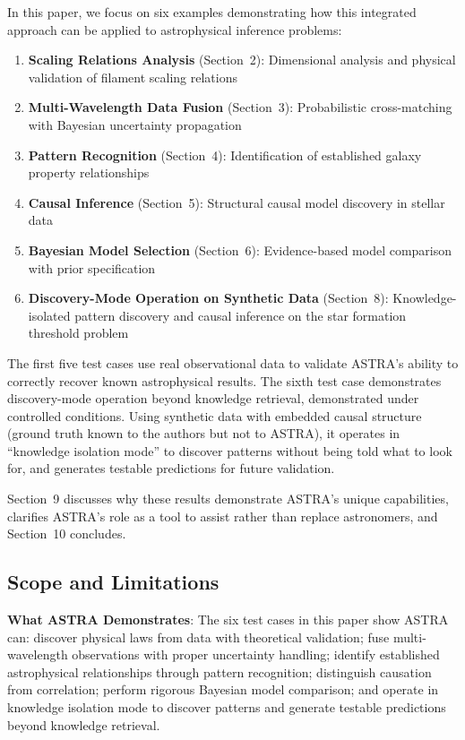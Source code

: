 \documentclass[usenatbib]{rasti}
\begin{document}
In this paper, we focus on six examples demonstrating how this integrated approach can be applied to astrophysical inference problems:
\begin{enumerate}
\item \textbf{Scaling Relations Analysis} (Section~2): Dimensional analysis and physical validation of filament scaling relations
\item \textbf{Multi-Wavelength Data Fusion} (Section~3): Probabilistic cross-matching with Bayesian uncertainty propagation
\item \textbf{Pattern Recognition} (Section~4): Identification of established galaxy property relationships
\item \textbf{Causal Inference} (Section~5): Structural causal model discovery in stellar data
\item \textbf{Bayesian Model Selection} (Section~6): Evidence-based model comparison with prior specification
\item \textbf{Discovery-Mode Operation on Synthetic Data} (Section~8): Knowledge-isolated pattern discovery and causal inference on the star formation threshold problem
\end{enumerate}

The first five test cases use real observational data to validate ASTRA's ability to correctly recover known astrophysical results. The sixth test case demonstrates discovery-mode operation beyond knowledge retrieval, demonstrated under controlled conditions. Using synthetic data with embedded causal structure (ground truth known to the authors but not to ASTRA), it operates in ``knowledge isolation mode'' to discover patterns without being told what to look for, and generates testable predictions for future validation.

Section~9 discusses why these results demonstrate ASTRA's unique capabilities, clarifies ASTRA's role as a tool to assist rather than replace astronomers, and Section~10 concludes.

\subsection{Scope and Limitations}

\textbf{What ASTRA Demonstrates}: The six test cases in this paper show ASTRA can: discover physical laws from data with theoretical validation; fuse multi-wavelength observations with proper uncertainty handling; identify established astrophysical relationships through pattern recognition; distinguish causation from correlation; perform rigorous Bayesian model comparison; and operate in knowledge isolation mode to discover patterns and generate testable predictions beyond knowledge retrieval.
\end{document}
